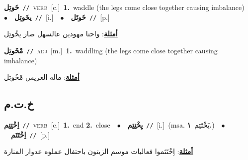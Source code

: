 \documentclass[10pt,a4paper,twoside]{article} %
\begin{document}
\begin{multicols}{2}
{{{\setlength\topsep{0pt}\textbf{\foreignlanguage{arabic}{خَوتِل}}\ {\color{gray}\texttt{//}\color{black}}\ \textsc{verb}\ [c.]\ \textbf{1.}~waddle (the legs come close together causing imbalance)\ \ $\bullet$\ \ \setlength\topsep{0pt}\textbf{\foreignlanguage{arabic}{يخَوتِل}}\ {\color{gray}\texttt{//}\color{black}}\ [i.]\ \ $\bullet$\ \ \setlength\topsep{0pt}\textbf{\foreignlanguage{arabic}{خَوتَل}}\ {\color{gray}\texttt{//}\color{black}}\ [p.]\  \begin{flushright}\color{gray}\foreignlanguage{arabic}{\textbf{\underline{\foreignlanguage{arabic}{أمثلة}}}: واحنا مهودين عالسهل صار يخُوتِل}\end{flushright}\color{black}} \vspace{2mm}

{\setlength\topsep{0pt}\textbf{\foreignlanguage{arabic}{مْخَوتِل}}\ {\color{gray}\texttt{//}\color{black}}\ \textsc{adj}\ [m.]\ \textbf{1.}~waddling (the legs come close together causing imbalance)\  \begin{flushright}\color{gray}\foreignlanguage{arabic}{\textbf{\underline{\foreignlanguage{arabic}{أمثلة}}}: ماله العريس مْخُوتِل}\end{flushright}\color{black}} \vspace{2mm}

\vspace{-3mm}
\subsection*{\color{blue}\foreignlanguage{arabic}{خ.ت.م}\color{blue}{}} 

{\setlength\topsep{0pt}\textbf{\foreignlanguage{arabic}{اِخْتِتِم}}\ {\color{gray}\texttt{//}\color{black}}\ \textsc{verb}\ [c.]\ \textbf{1.}~end  \textbf{2.}~close\ \ $\bullet$\ \ \setlength\topsep{0pt}\textbf{\foreignlanguage{arabic}{يِخْتِتِم}}\ {\color{gray}\texttt{//}\color{black}}\ [i.]\ \color{gray}(msa. \foreignlanguage{arabic}{يَخْتَتِم}~\foreignlanguage{arabic}{\textbf{١.}})\color{black}\ \ $\bullet$\ \ \setlength\topsep{0pt}\textbf{\foreignlanguage{arabic}{اِخْتَتَم}}\ {\color{gray}\texttt{//}\color{black}}\ [p.]\  \begin{flushright}\color{gray}\foreignlanguage{arabic}{\textbf{\underline{\foreignlanguage{arabic}{أمثلة}}}: اِخْتَتَموا فعاليات موسم الزيتون باحتفال عملوه عدوار المنارة}\end{flushright}\color{black}} \vspace{2mm}

}}
\end{multicols}
\end{document}
